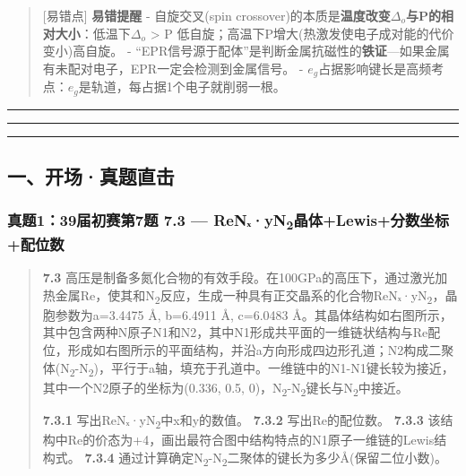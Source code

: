 \begin{quote}
{[}易错点{]} \textbf{易错提醒}
- 自旋交叉(spin crossover)的本质是\textbf{温度改变\(\Delta_o\)与P的相对大小}：低温下\(\Delta_o\) \textgreater{} P \箭 低自旋；高温下P增大(热激发使电子成对能的代价变小)\箭 高自旋。
- ``EPR信号源于配体''是判断金属抗磁性的\textbf{铁证}---如果金属有未配对电子，EPR一定会检测到金属信号。
- \(e_g\)占据影响键长是高频考点：\(e_g\)是轨道，每占据1个电子就削弱一根。
\end{quote}

\begin{center}\rule{0.5\linewidth}{0.5pt}\end{center}

\begin{center}\rule{0.5\linewidth}{0.5pt}\end{center}

\begin{center}\rule{0.5\linewidth}{0.5pt}\end{center}

\subsection{一、开场·真题直击}\label{ux4e00ux5f00ux573aux771fux9898ux76f4ux51fb-5}

\subsubsection{\texorpdfstring{真题1：39届初赛第7题 7.3 --- ReNₓ·yN\textsubscript{2}晶体+Lewis+分数坐标+配位数}{真题1：39届初赛第7题 7.3 --- ReNₓ·yN2晶体+Lewis+分数坐标+配位数}}\label{ux771fux9898139ux5c4aux521dux8d5bux7b2c7ux9898-7.3-renux2093yn2ux6676ux4f53lewisux5206ux6570ux5750ux6807ux914dux4f4dux6570}

\begin{quote}
\textbf{7.3} 高压是制备多氮化合物的有效手段。在100GPa的高压下，通过激光加热金属Re，使其和N\textsubscript{2}反应，生成一种具有正交晶系的化合物ReNₓ·yN\textsubscript{2}，晶胞参数为a=3.4475 Å, b=6.4911 Å, c=6.0483 Å。其晶体结构如右图所示，其中包含两种N原子N1和N2，其中N1形成共平面的一维链状结构与Re配位，形成如右图所示的平面结构，并沿a方向形成四边形孔道；N2构成二聚体(N\textsubscript{2}-N\textsubscript{2})，平行于a轴，填充于孔道中。一维链中的N1-N1键长较为接近，其中一个N2原子的坐标为(0.336, 0.5, 0)，N\textsubscript{2}-N\textsubscript{2}键长与N\textsubscript{2}中接近。

\textbf{7.3.1} 写出ReNₓ·yN\textsubscript{2}中x和y的数值。
\textbf{7.3.2} 写出Re的配位数。
\textbf{7.3.3} 该结构中Re的价态为+4，画出最符合图中结构特点的N1原子一维链的Lewis结构式。
\textbf{7.3.4} 通过计算确定N\textsubscript{2}-N\textsubscript{2}二聚体的键长为多少Å(保留二位小数)。
\end{quote}

